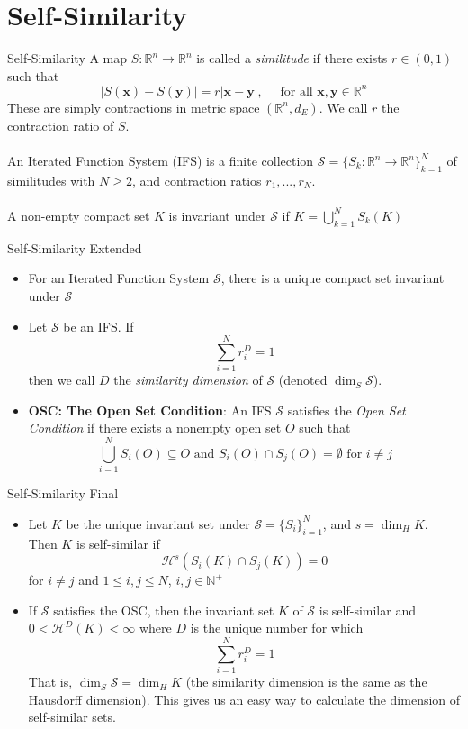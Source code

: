 \documentclass{beamer}
\begin{document}
\section{Self-Similarity}
\begin{frame}{Self-Similarity}
A map $S: \mathbb{R}^n \to \mathbb{R}^n$ is called a \textit{similitude} if there exists $r \in (0,1)$  such that \[
    |S(\mathbf{x}) - S(\mathbf{y})| = r |\mathbf{x}-\mathbf{y}|, \quad \text{ for all } \mathbf{x}, \mathbf{y} \in \mathbb{R}^n
    \]
    These are simply contractions in metric space $(\mathbb{R}^n, d_E)$. We call $r$ the contraction ratio of $S$.
    ~\\~\\An Iterated Function System (IFS) is a finite collection $\mathcal{S}=\{S_k:\mathbb{R}^n \to \mathbb{R}^n\}_{k=1}^N$ of similitudes with $N\ge 2$, and contraction ratios $r_1, ..., r_N$. 
    ~\\~\\A non-empty compact set $K$ is invariant under $\mathcal{S}$ if $K = \bigcup \limits _{k=1}^N S_k(K)$
\end{frame}

\begin{frame}{Self-Similarity Extended}
  \begin{itemize}
    \item For an Iterated Function System $\mathcal{S}$, there is a unique compact set invariant under $\mathcal{S}$
    \item Let $\mathcal{S}$ be an IFS. If \[
    \sum \limits_{i=1}^N r_i^D = 1
    \]then we call $D$ the \textit{similarity dimension} of $\mathcal{S}$ (denoted $\dim _S\mathcal{S} $).
    \item \textbf{OSC: The Open Set Condition}: An IFS $\mathcal{S}$ satisfies the \textit{Open Set Condition} if there exists a nonempty open set $O$ such that \[\bigcup \limits _{i=1}^N S_i(O) \subseteq O \text{ and } S_i(O) \cap S_j(O) = \emptyset \text{ for } i \ne j\]
  \end{itemize}
\end{frame}

\begin{frame}{Self-Similarity Final}
\begin{itemize}
  \item Let $K$ be the unique invariant set under $\mathcal{S} = \{S_i\}_{i=1}^N$, and $s = \dim _H K$. Then $K$ is self-similar if \[\mathcal{H}^s(S_i(K) \cap S_j(K)) = 0\] for $ i \ne j$ and $1\le i,j \le N$, $i,j \in \mathbb{N^+}$
  \item If $\mathcal{S}$ satisfies the OSC, then the invariant set $K$ of $\mathcal{S}$ is self-similar and $0 < \mathcal{H}^D(K)<\infty$ where $D$ is the unique number for which \[
    \sum \limits _{i=1}^N r_i^D = 1
    \]
    That is, $\dim _S \mathcal{S} = \dim _H K$ (the similarity dimension is the same as the Hausdorff dimension). This gives us an easy way to calculate the dimension of self-similar sets.
\end{itemize}
\end{frame}
\end{document}
